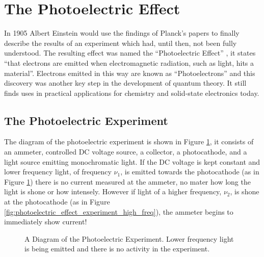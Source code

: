\documentclass[../../Quantum-Technologies-Notes]{subfiles}
\begin{document}
	
	\ifSubfilesClassLoaded{ \pagestyle{fancy} }{}
	
	
	\section{The Photoelectric Effect}
		In 1905 Albert Einstein would use the findings of Planck's papers to finally describe the results of an experiment which had, until then, not been fully understood. The resulting effect was named the ``Photoelectric Effect''  \cite{wiki_photoelectric_effect}, it states ``that electrons are emitted when electromagnetic radiation, such as light, hits a material''. Electrons emitted in this way are known as ``Photoelectrons'' and this discovery was another key step in the development of quantum theory. It still finds uses in practical applications for chemistry and solid-state electronics today. \linebreak
	
	
		\subsection{The Photoelectric Experiment}
			The diagram of the photoelectric experiment is shown in Figure \ref{fig:photoelectric_effect_experiment_low_freq}, it consists of an ammeter, controlled DC voltage source, a collector, a photocathode, and a light source emitting monochromatic light.\linebreak
			If the DC voltage is kept constant and lower frequency light, of frequency $\nu_1$, is emitted towards the photocathode (as in Figure \ref{fig:photoelectric_effect_experiment_low_freq}) there is no current measured at the ammeter, no mater how long the light is shone or how intensely. \linebreak 
			However if light of a higher frequency, $\nu_2$, is shone at the photocathode (as in Figure \ref{fig:photoelectric_effect_experiment_high_freq}), the ammeter begins to immediately show current! \linebreak
		
			\begin{figure}[!h]
				\centering
				
				\caption{A Diagram of the Photoelectric Experiment. Lower frequency light is being emitted and there is no activity in the experiment.}
				\label{fig:photoelectric_effect_experiment_low_freq}
			\end{figure}
			
\end{document}
